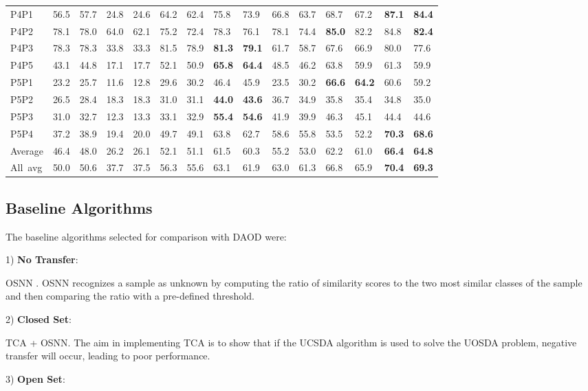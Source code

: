 \documentclass[journal]{IEEEtran}
\begin{document}
\begin{table*}[t]
\begin{tabular}{p{0.75cm}p{0.5cm}p{0.5cm}p{0.5cm}p{0.5cm}p{0.5cm}p{0.5cm}p{0.5cm}p{0.5cm}p{0.5cm}p{0.5cm}p{0.5cm}p{0.5cm}p{0.5cm}p{0.5cm}}
P4P1 &56.5&57.7&24.8&24.6&64.2&62.4&75.8&73.9&66.8&63.7&68.7&67.2&\textbf{87.1}&\textbf{84.4}\\
P4P2 &78.1&78.0&64.0&62.1&75.2&72.4&78.3&76.1&78.1&74.4&\textbf{85.0}&{82.2}&{84.8}&\textbf{82.4}\\
P4P3 &78.3&78.3&33.8&33.3&81.5&78.9&\textbf{81.3}&\textbf{79.1}&61.7&58.7&67.6&66.9&{80.0}&77.6\\
P4P5 &43.1&44.8&17.1&17.7&52.1&50.9&\textbf{65.8}&\textbf{64.4}&48.5&46.2&{63.8}&59.9&61.3&{59.9}\\
P5P1 &23.2&25.7&11.6&12.8&29.6&30.2&46.4&45.9&23.5&30.2&\textbf{66.6}&\textbf{64.2}&60.6&59.2\\
P5P2 &26.5&28.4&18.3&18.3&31.0&31.1&\textbf{44.0}&\textbf{43.6}&36.7&34.9&{35.8}&{35.4}&34.8&35.0\\
P5P3 &31.0&32.7&12.3&13.3&33.1&32.9&\textbf{55.4}&\textbf{54.6}&41.9&39.9&{46.3}&45.1&{44.4}&{44.6}\\
P5P4 &37.2&38.9&19.4&20.0&49.7&49.1&63.8&62.7&58.6&55.8&53.5&52.2&\textbf{70.3}&\textbf{68.6}\\
\hline
Average &46.4&48.0&26.2&26.1&52.1&51.1&61.5&60.3&55.2&53.0&62.2&61.0&\textbf{66.4}&\textbf{64.8}\\
\hline
\hline
All~avg&50.0&50.6&37.7&37.5&56.3&55.6&63.1&61.9&63.0&61.3&66.8&65.9&\textbf{70.4}&\textbf{69.3}\\
\hline
\end{tabular}
\end{table*}
\vspace{-0.2cm}


\subsection{Baseline Algorithms}
The baseline algorithms selected for comparison with DAOD were:

1) \textbf{No Transfer}:

 OSNN \cite{DBLP:journals/ml/Mendes-JuniorSW17}.  OSNN recognizes a sample as unknown by computing the ratio of similarity scores to the two most similar classes of the sample and then comparing the ratio with a pre-defined threshold.

2) \textbf{Closed Set}:

 TCA \cite{pan2011domain} + OSNN. The aim in implementing TCA is to show that if the UCSDA algorithm is used to solve the UOSDA problem, negative transfer will occur, leading to poor performance.

3) \textbf{Open Set}:
\end{document}
